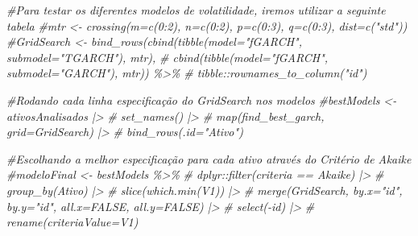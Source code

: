 \documentclass[
]{article}
\newenvironment{Shaded}{\begin{snugshade}}{\end{snugshade}}
\newcommand{\CommentTok}[1]{\textcolor[rgb]{0.56,0.35,0.01}{\textit{#1}}}
\begin{document}
\begin{Shaded}
\begin{Highlighting}[]
\CommentTok{\#Para testar os diferentes modelos de volatilidade, iremos utilizar a seguinte tabela}
\CommentTok{\#mtr \textless{}{-} crossing(m=c(0:2), n=c(0:2), p=c(0:3), q=c(0:3), dist=c("std"))}
\CommentTok{\#GridSearch \textless{}{-} bind\_rows(cbind(tibble(model="fGARCH", submodel="TGARCH"), mtr),}
\CommentTok{\#                        cbind(tibble(model="fGARCH", submodel="GARCH"), mtr)) \%\textgreater{}\%}
\CommentTok{\#  tibble::rownames\_to\_column("id")}

\CommentTok{\#Rodando cada linha especificação do GridSearch nos modelos}
\CommentTok{\#bestModels \textless{}{-} ativosAnalisados |\textgreater{} }
\CommentTok{\#  set\_names() |\textgreater{} }
\CommentTok{\#  map(find\_best\_garch, grid=GridSearch) |\textgreater{} }
\CommentTok{\#  bind\_rows(.id="Ativo")}

\CommentTok{\#Escolhando a melhor especificação para cada ativo através do Critério de Akaike}
\CommentTok{\#modeloFinal \textless{}{-}  bestModels \%\textgreater{}\%}
\CommentTok{\#  dplyr::filter(criteria == \textquotesingle{}Akaike\textquotesingle{}) |\textgreater{} }
\CommentTok{\#  group\_by(Ativo) |\textgreater{} }
\CommentTok{\#  slice(which.min(V1)) |\textgreater{} }
\CommentTok{\#  merge(GridSearch, by.x="id", by.y="id", all.x=FALSE, all.y=FALSE) |\textgreater{} }
\CommentTok{\#  select({-}id) |\textgreater{} }
\CommentTok{\#  rename(criteriaValue=V1)}
  


\end{Highlighting}
\end{Shaded}
\end{document}
